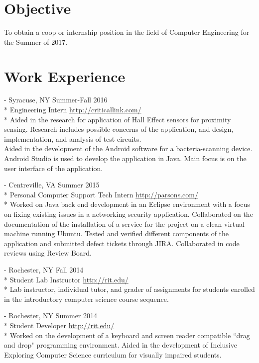 \documentclass[a4paper,margin,line]{resume}
\newcommand{\rurl}[1]{\hfill {\footnotesize \url{#1}}}
\newcommand{\rdate}[1]{\hfill {\small #1}}
\renewcommand{\employer}[5]{ \item[#1] - #2 \rdate{#3} \\* #4 \rurl{#5} \\*}
\begin{document}
\begin{resume}
\section{\mysidestyle Objective}
    To obtain a coop or internship position in the field of Computer Engineering for the Summer of 2017.
\section{\mysidestyle Work Experience}
	\begin{asparadesc}
        \employer{Critical Link LLC}{Syracuse, NY}{Summer-Fall 2016}{Engineering Intern}
        {http://criticallink.com/}
        \small
        Aided in the research for application of Hall Effect sensors for proximity sensing.  
        Research includes possible concerns of the application, and design, implementation, and analysis of 
        test circuits.\smallskip\\
        Aided in the development of the Android software for a bacteria-scanning device. Android 
        Studio is used to develop the application in Java. Main focus is on the user interface of the application.
        \normalsize
        \\
        \employer{Parsons Government Services}{Centreville, VA}{Summer 2015}{Personal Computer Support Tech Intern}
        {http://parsons.com/}
        \small
        Worked on Java back end development in an Eclipse environment with a focus on fixing existing 
        issues in a networking security application. Collaborated on the documentation of the installation 
        of a service for the project on a clean virtual machine running Ubuntu. Tested and verified 
        different components of the application and submitted defect tickets through JIRA.  Collaborated 
        in code reviews using Review Board.
        \normalsize
        \\
        \employer{Rochester Institute of Technology}{Rochester, NY}{Fall 2014}{Student Lab Instructor}
        {http://rit.edu/}
        \small
        Lab instructor, individual tutor, and grader of assignments for students enrolled in the 
        introductory computer science course sequence.
        \normalsize
        \\
        \employer{Rochester Institute of Technology}{Rochester, NY}{Summer 2014}{Student Developer}
        {http://rit.edu/}
        \small
        Worked on the development of a keyboard and screen reader compatible ``drag and drop" programming 
        environment.  Aided in the development of Inclusive Exploring Computer Science curriculum for 
        visually impaired students.
        \normalsize
        \\
    \end{asparadesc}


\end{resume}
\end{document}
